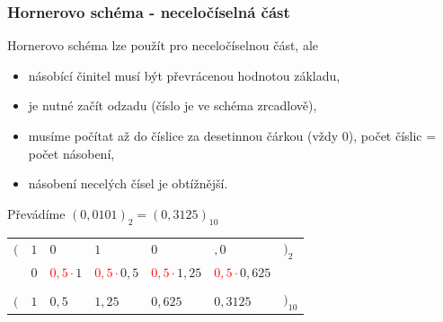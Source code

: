   \begin{frame}
    \frametitle{Hornerovo schéma - neceločíselná část}
    Hornerovo schéma lze použít pro neceločíselnou část, ale
    
		\begin{minipage}[t][0.4\textheight][t]{\textwidth}
      \begin{itemize}
        \item násobící činitel musí být převrácenou hodnotou základu,
        \item je nutné začít odzadu (číslo je ve schéma zrcadlově),
        \item musíme počítat až do číslice za desetinnou čárkou (vždy 0), počet číslic = počet násobení,
        \item násobení necelých čísel je obtížnější.
      \end{itemize}
		\end{minipage}
		
		\begin{minipage}[t][0.5\textheight][t]{\textwidth}
      \boldmath
      Převádíme $(0,0101)_2=(0,3125)_{10}$
      
      \begin{center}
        \begin{tabular}{p{5mm} p{15mm} p{15mm} p{15mm} p{15mm} p{15mm} p{5mm}}
         $($ & $1$ & $0$ & $1$ & $0$ & $,0$ & $)_2$ \\
             & 0 & \textcolor{red}{$0{,}5\cdot$}$1$ & \textcolor{red}{$0{,}5\cdot$}$0{,}5$ & \textcolor{red}{$0{,}5\cdot$}$1{,}25$ & \textcolor{red}{$0{,}5\cdot$}$0{,}625$ & \\
         \hline \\
         $($ & $1$ & $0,5$ & $1,25$ & $0,625$ & $0,3125$ & $)_{10}$
        \end{tabular}
      \end{center}
		\end{minipage}
		
	\end{frame}